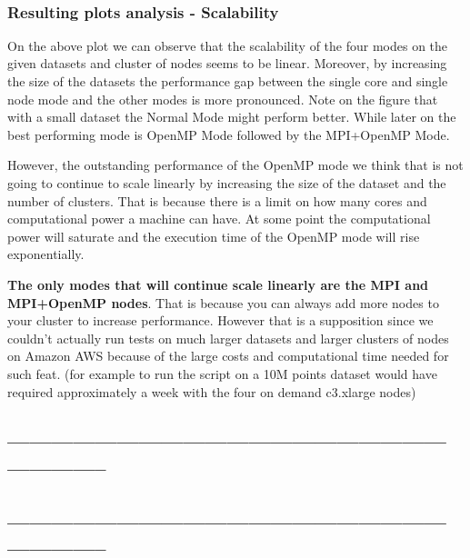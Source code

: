 \documentclass[11pt]{article}
\begin{document}
    \begin{center}
    \end{center}
    { \hspace*{\fill} \\}
    
    \hypertarget{resulting-plots-analysis---scalability}{%
\subsubsection{Resulting plots analysis -
Scalability}\label{resulting-plots-analysis---scalability}}

On the above plot we can observe that the scalability of the four modes
on the given datasets and cluster of nodes seems to be linear. Moreover,
by increasing the size of the datasets the performance gap between the
single core and single node mode and the other modes is more pronounced.
Note on the figure that with a small dataset the Normal Mode might
perform better. While later on the best performing mode is OpenMP Mode
followed by the MPI+OpenMP Mode.

However, the outstanding performance of the OpenMP mode we think that is
not going to continue to scale linearly by increasing the size of the
dataset and the number of clusters. That is because there is a limit on
how many cores and computational power a machine can have. At some point
the computational power will saturate and the execution time of the
OpenMP mode will rise exponentially.

\textbf{The only modes that will continue scale linearly are the MPI and
MPI+OpenMP nodes}. That is because you can always add more nodes to your
cluster to increase performance. However that is a supposition since we
couldn't actually run tests on much larger datasets and larger clusters
of nodes on Amazon AWS because of the large costs and computational time
needed for such feat. (for example to run the script on a 10M points
dataset would have required approximately a week with the four on demand
c3.xlarge nodes)

    \hypertarget{section}{%
\subsection{--------------------------------------------------------------------------}\label{section}}

\hypertarget{section-1}{%
\subsection{--------------------------------------------------------------------------}\label{section-1}}
\end{document}

